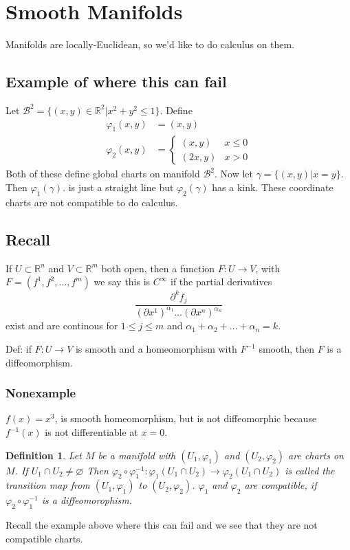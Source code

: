 \documentclass[a4paper]{article}
\newtheorem*{defn}{Definition}
\begin{document}
\section*{Smooth Manifolds}
Manifolds are locally-Euclidean, so we'd like to do calculus on them.  

\subsection*{Example of where this can fail}
Let $\mathcal{B}^2 = \{(x,y) \in \mathds{R}^2 | x^2 + y^2 \leq 1 \}$. Define 
\[
    \begin{aligned}
        \varphi_1(x,y) &= (x,y) \\
        \varphi_2(x,y) &= 
    \begin{cases}
        (x,y) & x \leq 0 \\
        (2x, y) & x > 0
    \end{cases}
    \end{aligned}
\]
Both of these define global charts on manifold $\mathcal{B}^2$. Now let $\gamma = \{(x,y) | x=y\}$. Then $\varphi_1(\gamma)$. is just a straight line but $\varphi_2(\gamma)$ has a kink. These coordinate charts are not compatible to do calculus.

\subsection*{Recall}
If $U \subset \mathds{R}^n$ and $V \subset \mathds{R}^m$ both open, then a function $F: U \rightarrow V$, with $F = (f^1, f^2, \dots, f^m)$ we say this is $C^{\infty}$ if the partial derivatives
\[
    \frac{\partial^kf_j}{(\partial x^1)^{\alpha_1}\dots(\partial x^n)^{\alpha_n}}
\]
exist and are continous for $1 \leq j \leq m$ and $\alpha_1 + \alpha_2 + \dots + \alpha_n = k$.

Def: if $F: U \rightarrow V$ is smooth and a homeomorphism with $F^{-1}$ smooth, then $F$ is a diffeomorphism.

\subsubsection*{Nonexample}
$f(x) = x^3$, is smooth homeomorphism, but is not diffeomorphic because $f^{-1}(x)$ is not differentiable at $x=0$.

\begin{defn}
Let $M$ be a manifold with $(U_1, \varphi_1)$ and $(U_2, \varphi_2)$ are charts on $M$. If $U_1 \cap U_2 \neq \varnothing$  Then $\varphi_2 \circ \varphi_1^{-1}: \varphi_1(U_1 \cap U_2) \rightarrow \varphi_2(U_1 \cap U_2)$ is called the transition map from $(U_1, \varphi_1)$ to $(U_2, \varphi_2)$. $\varphi_1$ and $\varphi_2$ are compatible, if $\varphi_2 \circ \varphi_1^{-1}$ is a diffeomorophism. 
\end{defn}
Recall the example above where this can fail and we see that they are not compatible charts.
\end{document}
